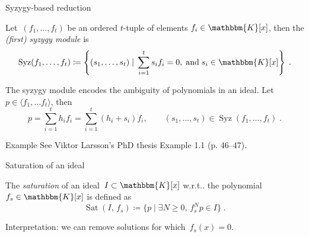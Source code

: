 \documentclass[aspectratio=169]{beamer}
\makeatletter
\newcommand{\K}{\ensuremath{\mathbbm{K}}}
\DeclareRobustCommand\wrt{w.r.t\@ifnextchar.{}{.\@}}
\DeclareMathOperator{\syz}{Syz}
\DeclareMathOperator{\sat}{Sat}
\makeatother
\begin{document}
\begin{frame}{Syzygy-based reduction}
\begin{definition}
Let~$(f_1,\ldots,f_t)$ be an ordered $t$-tuple of elements
$f_i\in\K[x]$, then the \emph{(first) syzygy module} is
\begin{equation*}
\syz(f_1,\ldots,f_t) \coloneqq \left\{
    (s_1,\ldots,s_t)\;|\; \sum_{i=1}^t s_if_i=0, \;\mathrm{ and }\; s_i\in\K[x]
\right\}\;.
\end{equation*}
\end{definition}
The syzygy module encodes the ambiguity of polynomials in an ideal.
Let $p\in \langle f_1,\ldots f_t\rangle$, then
\begin{equation*}
    p = \sum_{i=1}^t h_if_i = \sum_{i=1}^t (h_i+s_i)f_i, \qquad (s_1,\ldots,s_t)\in\syz(f_1,\ldots,f_t)\;.
\end{equation*}
\end{frame}

\begin{frame}{Example}
See Viktor Larsson's PhD thesis Example 1.1 (p. 46--47).
\end{frame}

\begin{frame}{Saturation of an ideal}
\begin{definition}
The \emph{saturation} of an ideal~$I\subset\K[x]$ \wrt{} the polynomial $f_s\in\K[x]$ is
defined as
\begin{equation*}
    \sat(I,\, f_s) \coloneqq \{p\;|\;\exists N\geq 0,\, f_s^N p\in I  \}\;.
\end{equation*}
\end{definition}
\alert{Interpretation:} we can remove solutions for which~$f_s(x) =0$.
\end{frame}
\end{document}
